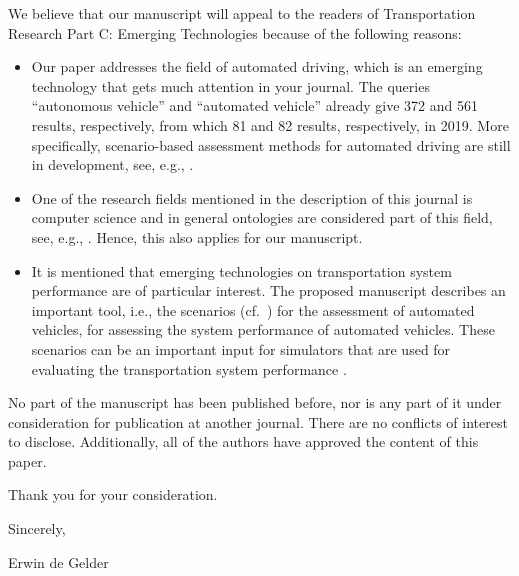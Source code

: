 \documentclass{article}
\renewcommand{\cite}[1]{\parencite{#1}}
\begin{document}
We believe that our manuscript will appeal to the readers of Transportation Research Part C: Emerging Technologies because of the following reasons:
\begin{itemize}
	\item Our paper addresses the field of automated driving, which is an emerging technology that gets much attention in your journal. The queries ``autonomous vehicle'' and ``automated vehicle'' already give 372 and 561 results, respectively, from which 81 and 82 results, respectively, in 2019. More specifically, scenario-based assessment methods for automated driving are still in development, see, e.g., \textcite{hou2019framework, shao2019evaluating, ge2018experimental, cui2018development, sepulcre2013cooperative}.
	\item One of the research fields mentioned in the description of this journal is computer science and in general ontologies are considered part of this field, see, e.g., \textcite{katsumi2018ontologies, benvenuti2017ontologybased, choi2015ontological, maiti2017conceptualization, ali2017fuzzy}. Hence, this also applies for our manuscript.
	\item It is mentioned that emerging technologies on transportation system performance are of particular interest. The proposed manuscript describes an important tool, i.e., the scenarios (cf.\ \textcite{xiong2015orchestration, bhatti2015design}) for the assessment of automated vehicles, for assessing the system performance of automated vehicles. These scenarios can be an important input for simulators that are used for evaluating the transportation system performance \cite{hou2019framework, cui2018development, ma2017twodimensional, mcconky2019dontpass}.
\end{itemize}

No part of the manuscript has been published before, nor is any part of it under consideration for publication at another journal. There are no conflicts of interest to disclose. Additionally, all of the authors have approved the content of this paper.

\vspace{1em}

Thank you for your consideration.

\vspace{1em}

Sincerely,

Erwin de Gelder

\printbibliography
\end{document}
